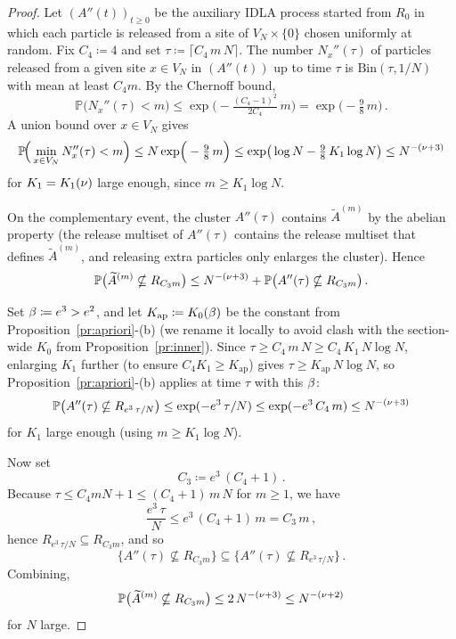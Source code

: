 \documentclass[11pt,a4paper,reqno]{amsart}
\theoremstyle{definition}
\newcommand{\bbP}{{\ensuremath{\mathbb P}} }
\begin{document}
\begin{proof}
Let $(A''(t))_{t \geq 0}$ be the auxiliary IDLA process started from $R_0$ in which each particle is released from a site of $V_N \times \{0\}$ chosen uniformly at random. Fix $C_4 \coloneqq 4$ and set $\tau \coloneqq \lceil C_4\, m\, N\rceil$. The number $N_x''(\tau)$ of particles released from a given site $x \in V_N$ in $(A''(t))$ up to time $\tau$ is $\mathrm{Bin}(\tau, 1/N)$ with mean at least $C_4 m$. By the Chernoff bound,
	\[ \bbP\big( N_x''(\tau) < m \big) \leq \exp\!\Big( -\tfrac{(C_4 - 1)^2}{2 C_4}\,m \Big) = \exp\!\Big( -\tfrac{9}{8}\, m \Big)\,. \]
A union bound over $x \in V_N$ gives
	\[ \bbP\!\Big( \min_{x \in V_N} N_x''(\tau) < m \Big) \leq N \exp\!\Big( -\tfrac{9}{8}\,m \Big) \leq \exp\!\big( \log N - \tfrac{9}{8}\, K_1 \log N\big) \leq N^{-(\n+3)} \]
for $K_1 = K_1(\nu)$ large enough, since $m \geq K_1 \log N$.

On the complementary event, the cluster $A''(\tau)$ contains $\widetilde A^{(m)}$ by the abelian property (the release multiset of $A''(\tau)$ contains the release multiset that defines $\widetilde A^{(m)}$, and releasing extra particles only enlarges the cluster). Hence
	\[ \bbP\big( \widetilde A^{(m)} \nsubseteq R_{C_3 m} \big) \leq N^{-(\n+3)} + \bbP\big( A''(\tau) \nsubseteq R_{C_3 m} \big)\,. \]

Set $\beta \coloneqq e^3 > e^2$, and let $K_{\mathrm{ap}} \coloneqq K_0(\beta)$ be the constant from Proposition~\ref{pr:apriori}-(b) (we rename it locally to avoid clash with the section-wide $K_0$ from Proposition~\ref{pr:inner}). Since $\tau \geq C_4\, m\, N \geq C_4\, K_1\, N\log N$, enlarging $K_1$ further (to ensure $C_4 K_1 \geq K_{\mathrm{ap}}$) gives $\tau \geq K_{\mathrm{ap}}\, N\log N$, so Proposition~\ref{pr:apriori}-(b) applies at time $\tau$ with this $\beta$:
	\[ \bbP\big( A''(\tau) \nsubseteq R_{e^3\,\tau/N} \big) \leq \exp(-e^3\,\tau/N) \leq \exp(-e^3\, C_4\, m) \leq N^{-(\n+3)} \]
for $K_1$ large enough (using $m \geq K_1 \log N$).

Now set
\[
  C_3 \coloneqq e^3\,(C_4 + 1)\,.
\]
Because $\tau \leq C_4 m N + 1 \leq (C_4 + 1)\,m\,N$ for $m \geq 1$, we have
\[
  \frac{e^3\,\tau}{N} \leq e^3\,(C_4 + 1)\,m = C_3\, m\,,
\]
hence $R_{e^3\,\tau/N} \subseteq R_{C_3 m}$, and so
\[
  \{A''(\tau) \nsubseteq R_{C_3 m}\} \subseteq \{A''(\tau) \nsubseteq R_{e^3\,\tau/N}\}\,.
\]
Combining,
\[
  \bbP\big(\widetilde A^{(m)} \nsubseteq R_{C_3 m}\big) \leq 2\, N^{-(\n+3)} \leq N^{-(\n+2)}
\]
for $N$ large.
\end{proof}
\end{document}

